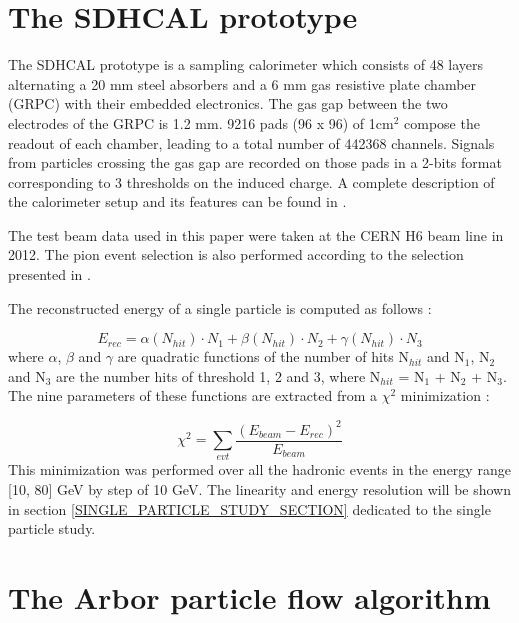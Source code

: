 \documentclass[cits]{JINST}
\begin{document}
\newpage
\section{The SDHCAL prototype}

The SDHCAL prototype is a sampling calorimeter which consists of 48 layers alternating a 20 mm steel absorbers and a 6 mm gas resistive plate chamber (GRPC) with their embedded electronics. The gas gap between the two electrodes of the GRPC is 1.2 mm. 9216 pads (96 x 96) of 1cm$^2$ compose the readout of each chamber, leading to a total number of 442368 channels. Signals from particles crossing the gas gap are recorded on those pads in a 2-bits format corresponding to 3 thresholds on the induced charge. A complete description of the calorimeter setup and its features can be found in \cite{sdhcal-paper}. 

The test beam data used in this paper were taken at the CERN H6 beam line in 2012. The pion event selection is also performed according to the selection presented in \cite{sdhcal-paper}.

The reconstructed energy of a single particle is computed as follows :

\begin{equation}
  E_{rec} = \alpha(N_{hit}) \cdot N_{1}
          + \beta(N_{hit}) \cdot N_{2}
          + \gamma(N_{hit}) \cdot N_{3}   
\end{equation}
where $\alpha$, $\beta$ and $\gamma$ are quadratic functions of the number of hits N$_{hit}$ and N$_1$, N$_2$ and N$_3$ are the number hits of threshold 1, 2 and 3, where N$_{hit}$ = N$_1$ + N$_2$ + N$_3$. The nine parameters of these functions are extracted from a $\chi^2$ minimization :

\begin{equation}
  \chi^2 = \sum\limits_{evt} \frac{(E_{beam} - E_{rec})^2}{E_{beam}}
\end{equation}
This minimization was performed over all the hadronic events in the energy range [10, 80] GeV by step of 10 GeV. The linearity and energy resolution will be shown in section \ref{SINGLE_PARTICLE_STUDY_SECTION} dedicated to the single particle study.

\newpage
\section{The Arbor particle flow algorithm}
\end{document}
